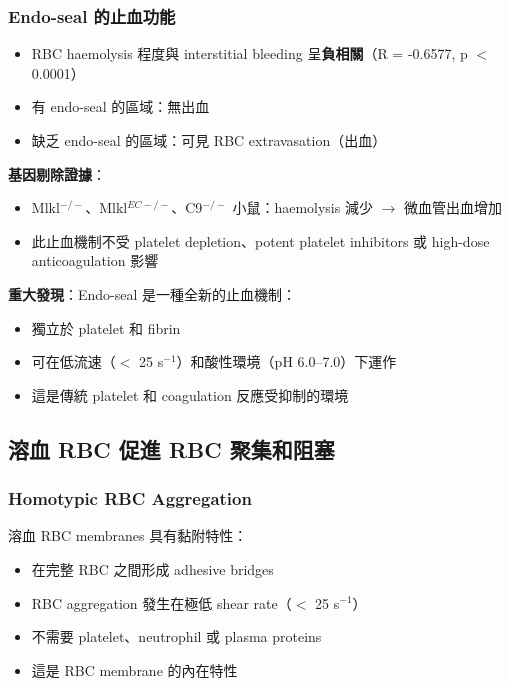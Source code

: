\documentclass[12pt,a4paper]{article}
\begin{document}
\subsubsection{Endo-seal 的止血功能}

\begin{itemize}
    \item RBC haemolysis 程度與 interstitial bleeding 呈\textbf{負相關}（R = -0.6577, p $<$ 0.0001）
    \item 有 endo-seal 的區域：無出血
    \item 缺乏 endo-seal 的區域：可見 RBC extravasation（出血）
\end{itemize}

\textbf{基因剔除證據}：
\begin{itemize}
    \item Mlkl$^{-/-}$、Mlkl$^{EC-/-}$、C9$^{-/-}$ 小鼠：haemolysis 減少 $\rightarrow$ 微血管出血增加
    \item 此止血機制不受 platelet depletion、potent platelet inhibitors 或 high-dose anticoagulation 影響
\end{itemize}

\begin{importantbox}
\textbf{重大發現}：Endo-seal 是一種全新的止血機制：
\begin{itemize}
    \item 獨立於 platelet 和 fibrin
    \item 可在低流速（$<$ 25 s$^{-1}$）和酸性環境（pH 6.0--7.0）下運作
    \item 這是傳統 platelet 和 coagulation 反應受抑制的環境
\end{itemize}
\end{importantbox}

\subsection{溶血 RBC 促進 RBC 聚集和阻塞}

\subsubsection{Homotypic RBC Aggregation}

溶血 RBC membranes 具有黏附特性：
\begin{itemize}
    \item 在完整 RBC 之間形成 adhesive bridges
    \item RBC aggregation 發生在極低 shear rate（$<$ 25 s$^{-1}$）
    \item 不需要 platelet、neutrophil 或 plasma proteins
    \item 這是 RBC membrane 的內在特性
\end{itemize}
\end{document}
